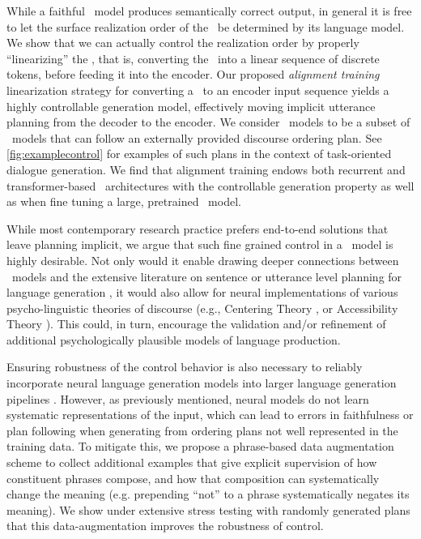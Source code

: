 While a faithful \sequencetosequence~model produces semantically correct
output, in general it is free to let the surface realization order of the
\attributevalues~be determined by its language model. We show that we can
actually control the realization order by properly ``linearizing'' the
\meaningrepresentation, that is, converting the \meaningrepresentation~into a
linear sequence of discrete tokens, before feeding it into the encoder. Our
proposed \textit{alignment training} linearization strategy for converting a
\meaningrepresentation~to an encoder input sequence yields a highly
controllable generation model, effectively moving implicit utterance planning
from the decoder to the encoder.  We consider \controllablegeneration~models to
be a subset of \faithfulgeneration~models that can follow an externally
provided discourse ordering plan.  See \autoref{fig:examplecontrol} for
examples of such plans in the context of  task-oriented dialogue generation.
We find that alignment training endows both recurrent and transformer-based
\sequencetosequence~architectures with the controllable generation property as
well as when fine tuning a large, pretrained \sequencetosequence~model.

While most contemporary research practice prefers end-to-end solutions that
leave planning implicit, we argue that such fine grained control in a
\sequencetosequence~model  is highly desirable.  Not only would it enable
drawing deeper connections between \sequencetosequence~models and the extensive
literature on sentence or utterance level planning for language generation
\citep{reiter2000,walker2001,stone2003}, it would also allow for neural
implementations of various psycho-linguistic theories of discourse (e.g.,
Centering Theory \citep{grosz1995}, or Accessibility Theory \citep{ariel2001}).
This could, in turn, encourage the validation and/or refinement of additional
psychologically plausible models of language production. 

Ensuring robustness of the control behavior is also necessary to reliably
incorporate neural language generation models into larger language generation
pipelines \citep{moryossef2019a,moryossef2019b,castroferreira2019}.  However,
as previously mentioned, neural models do not learn systematic representations
of the input, which can lead to errors in faithfulness or plan following when
generating from ordering plans not well represented in the training data. To
mitigate this, we propose a phrase-based data augmentation scheme to collect
additional examples that give explicit supervision of how constituent phrases
compose, and how that composition can systematically change the meaning (e.g.
prepending ``not'' to a phrase systematically negates its meaning). We show
under extensive stress testing with randomly generated plans that this
data-augmentation improves the robustness of control.

